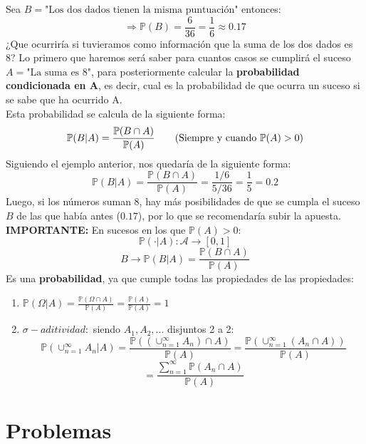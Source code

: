 \documentclass[11pt]{article}
\newcommand{\prob}{\mathbb{P}}
\newcommand{\OMG}{\varOmega}
\theoremstyle{plain}
\begin{document}
        Sea $B = \text{"Los dos dados tienen la misma puntuación"}$ entonces:
        \[\Rightarrow \prob(B) = \frac{6}{36} = \frac{1}{6} \approx 0.17\]
        ¿Que ocurriría si tuvieramos como información que la suma de los dos dados es 8? Lo primero que haremos será saber para cuantos casos se cumplirá el suceso $A = \text{"La suma es 8"}$, para posteriormente calcular la \textbf{probabilidad condicionada en A}, es decir, cual es la probabilidad de que ocurra un suceso si se sabe que ha ocurrido A.\\

        Esta probabilidad se calcula de la siguiente forma:
        \begin{equation}
            \prob (B | A) = \frac{\prob(B \cap A)}{\prob(A)} \tag{Siempre y cuando $\prob(A) > 0$}
        \end{equation}
        Siguiendo el ejemplo anterior, nos quedaría de la siguiente forma:
        \[\prob (B | A) = \frac{\prob(B \cap A)}{\prob(A)} = \frac{1/6}{5/36} = \frac{1}{5} = 0.2\]
        Luego, si los números suman 8, hay más posibilidades de que se cumpla el suceso $B$ de las que había antes ($0.17$), por lo que se recomendaría subir la apuesta.\\

        \textbf{IMPORTANTE:} En sucesos en los que $\prob(A)>0$:
        \[\prob(\cdot | A) : \mathcal{A} \rightarrow [0,1]\]
        \[B \rightarrow \prob(B | A) = \frac{\prob(B \cap A)}{\prob(A)}\]
        Es una \textbf{probabilidad}, ya que cumple todas las propiedades de las propiedades:
        \begin{enumerate}
            \item $\prob(\OMG | A) = \frac{\prob(\OMG \cap A)}{\prob(A)} = \frac{\prob(A)}{\prob(A)} = 1$
            \item $\sigma-aditividad:$ siendo $A_1,A_2,...$ disjuntos 2 a 2: \[\prob(\cup_{n=1}^{\infty} A_n | A) = \frac{\prob((\cup_{n=1}^{\infty} A_n) \cap A)}{\prob(A)} = \frac{\prob(\cup_{n=1}^{\infty} (A_n\cap A))}{\prob(A)}\]
            \[= \frac{ \sum_{ n=1 }^{ \infty } \prob(A_n \cap A)}{\prob(A)} \]
        \end{enumerate}

    \section{Problemas} %
    \label{sec:problemas}
\end{document}
